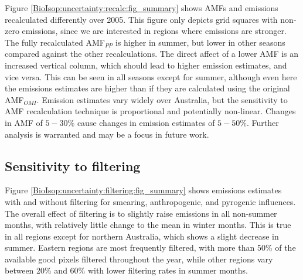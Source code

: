       Figure \ref{BioIsop:uncertainty:recalc:fig_summary} shows AMFs and emissions recalculated differently over 2005.
      This figure only depicts grid squares with non-zero emissions, since we are interested in regions where emissions are stronger.
      The fully recalculated AMF$_{PP}$ is higher in summer, but lower in other seasons compared against the other recalculations.
      The direct affect of a lower AMF is an increased vertical column, which should lead to higher emission estimates, and vice versa.
      This can be seen in all seasons except for summer, although even here the emissions estimates are higher than if they are calculated using the original AMF$_{OMI}$.
      Emission estimates vary widely over Australia, but the sensitivity to AMF recalculation technique is proportional and potentially non-linear.
      Changes in AMF of $5-30\%$ cause changes in emission estimates of $5-50\%$.
      Further analysis is warranted and may be a focus in future work.
      
      
      
      
  
    \subsection{Sensitivity to filtering}
    \label{BioIsop:uncertainty:filtering}
    
      Figure \ref{BioIsop:uncertainty:filtering:fig_summary} shows emissions estimates with and without filtering for smearing, anthropogenic, and pyrogenic influences.
      The overall effect of filtering is to slightly raise emissions in all non-summer months, with relatively little change to the mean in winter months.
      This is true in all regions except for northern Australia, which shows a slight decrease in summer.
      Eastern regions are most frequently filtered, with more than 50\% of the available good pixels filtered throughout the year, while other regions vary between 20\% and 60\% with lower filtering rates in summer months.
      
